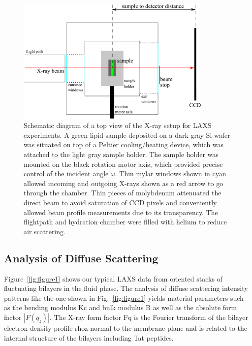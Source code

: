 \begin{figure}[htbp]
  \centering
  \includegraphics[width=0.85\textwidth]{figures/Tat/MMs/chamber_geometry}
  \caption[Schematic diagram of a top view of the X-ray setup for LAXS experiments]
  {Schematic diagram of a top view of the X-ray setup for LAXS experiments.
  A green lipid sample deposited on a dark gray Si wafer 
  was situated on top of a Peltier cooling/heating
  device, which was attached to the light gray sample holder. 
  The sample holder was mounted on the black rotation motor axis, which provided 
  precise control of the incident angle $\omega$. Thin mylar windows shown 
  in cyan allowed incoming
  and outgoing X-rays shown as a red arrow to go through the chamber.
  Thin pieces of molybdenum attenuated
  the direct beam to avoid saturation of CCD pixels and conveniently allowed 
  beam profile measurements due to its transparency. The flightpath and hydration chamber
  were filled with helium to reduce air scattering.}
  \label{fig:x-ray_setup}
\end{figure}

\subsection{Analysis of Diffuse Scattering}\label{sec:diffuse_analysis}
Figure~\ref{fig:figure1} shows our typical LAXS data 
from oriented stacks of fluctuating bilayers in the fluid phase. 
The analysis of diffuse scattering 
intensity patterns like the one shown in Fig.~\ref{fig:figure1} yields material 
parameters such as the bending modulus \gls{Kc} and bulk modulus \gls{B} as well as
the absolute form factor $|F(q_z)|$. 
The X-ray form factor \gls{Fq} is the Fourier transform of the bilayer electron 
density profile \gls{rhoz} normal to the membrane plane 
and is related to the internal structure of the
bilayers including Tat peptides.

